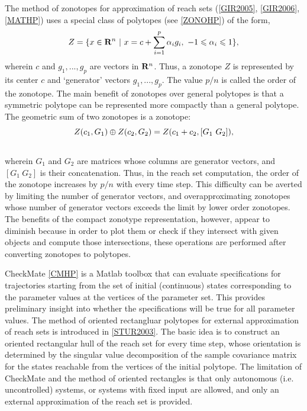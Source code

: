 \documentclass[letterpaper,10pt,english]{sphinxmanual}
\begin{document}
The method of zonotopes for approximation of reach sets ({\hyperref[main_source:gir2005]{{[}GIR2005{]}}}, {\hyperref[main_source:gir2006]{{[}GIR2006{]}}}, {\hyperref[main_source:mathp]{{[}MATHP{]}}})
uses a special class of polytopes (see {\hyperref[main_source:zonohp]{{[}ZONOHP{]}}})
of the form,
\begin{gather}
\begin{split}Z=\{x \in {\bf R}^n ~|~
x=c+\sum_{i=1}^p\alpha_ig_i,~ -1\leqslant\alpha_i\leqslant1\},\end{split}\notag
\end{gather}
wherein $c$ and $g_1, ..., g_p$ are vectors in
${\bf R}^n$. Thus, a zonotope $Z$ is represented by its
center $c$ and ‘generator’ vectors $g_1, ..., g_p$. The
value $p/n$ is called the order of the zonotope. The main benefit
of zonotopes over general polytopes is that a symmetric polytope can be
represented more compactly than a general polytope. The geometric sum of
two zonotopes is a zonotope:
\begin{gather}
\begin{split}Z(c_1, G_1)\oplus Z(c_2, G_2) = Z(c_1+c_2, [G_1 ~ G_2]),\end{split}\notag\\\begin{split}\end{split}\notag
\end{gather}
wherein $G_1$ and $G_2$ are matrices whose columns are
generator vectors, and $[G_1 ~ G_2]$ is their concatenation. Thus,
in the reach set computation, the order of the zonotope increases by
$p/n$ with every time step. This difficulty can be averted by
limiting the number of generator vectors, and overapproximating
zonotopes whose number of generator vectors exceeds the limit by lower
order zonotopes. The benefits of the compact zonotype representation,
however, appear to diminish because in order to plot them or check if
they intersect with given objects and compute those intersections, these
operations are performed after converting zonotopes to polytopes.

CheckMate {\hyperref[main_source:cmhp]{{[}CMHP{]}}} is a Matlab toolbox that can evaluate
specifications for trajectories starting from the set of initial
(continuous) states corresponding to the parameter values at the
vertices of the parameter set. This provides preliminary insight into
whether the specifications will be true for all parameter values. The
method of oriented rectangluar polytopes for external approximation of
reach sets is introduced in {\hyperref[main_source:stur2003]{{[}STUR2003{]}}}. The basic idea
is to construct an oriented rectangular hull of the reach set for every
time step, whose orientation is determined by the singular value
decomposition of the sample covariance matrix for the states reachable
from the vertices of the initial polytope. The limitation of CheckMate
and the method of oriented rectangles is that only autonomous (i.e.
uncontrolled) systems, or systems with fixed input are allowed, and only
an external approximation of the reach set is provided.
\end{document}
